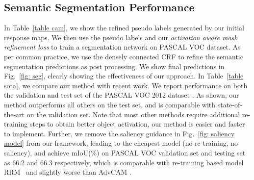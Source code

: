 \documentclass[10pt,twocolumn,letterpaper]{article}
\begin{document}
\subsection{Semantic Segmentation Performance}
In Table~\ref{table cam}, we show the refined pseudo labels generated by our initial response maps.
We then use the pseudo labels and our \emph{activation aware mask refinement loss} to train a segmentation network on PASCAL VOC dataset.
As per common practice, we use the densely connected CRF \cite{krahenbuhl2011efficient} to refine the semantic segmentation predictions as post processing. We show final predictions in Fig.~\ref{fig: seg},  clearly showing the effectiveness of our approach. 
In Table~\ref{table sota}, we compare our method with recent work.
We report performance on both the validation and test set of the PASCAL VOC 2012 dataset \cite{everingham2010pascal}. 
As shown, 
our method outperforms all others on the test set, and is comparable with state-of-the-art on the validation set.
Note that most other methods require additional re-training steps
to obtain better object activation,
our method is easier and faster to implement. Further, we remove the saliency guidance in Fig.~\ref{fig: saliency model} from our framework, leading to the cheapest model (no re-training, no saliency), and achieve mIoU(\%) on PASCAL VOC validation set and testing set as 66.2 and 66.3 respectively, which is comparable with re-training based model RRM~\cite{zhang2020reliability} and slightly worse than AdvCAM \cite{lee2021anti}.
\end{document}

